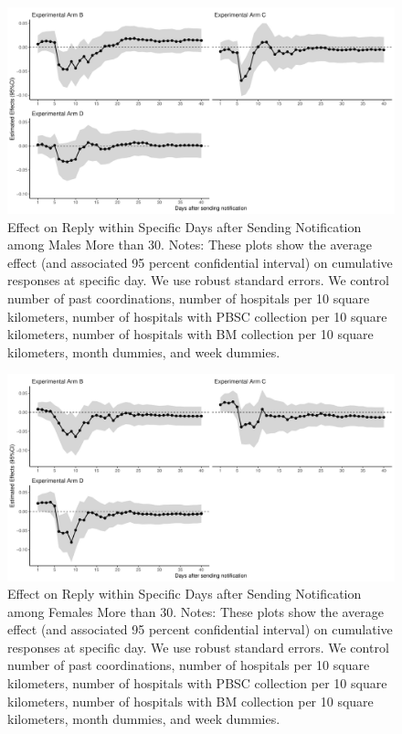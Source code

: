 \documentclass[
]{article}
\begin{document}
\begin{figure}[t]
\includegraphics{body_files/figure-latex/old-male-flow-1} \caption{Effect on Reply within Specific Days after Sending Notification among Males More than 30. Notes: These plots show the average effect (and associated 95 percent confidential interval) on cumulative responses at specific day. We use robust standard errors. We control number of past coordinations, number of hospitals per 10 square kilometers, number of hospitals with PBSC collection per 10 square kilometers, number of hospitals with BM collection per 10 square kilometers, month dummies, and week dummies.}\label{fig:old-male-flow}
\end{figure}

\begin{figure}[t]
\includegraphics{body_files/figure-latex/old-female-flow-1} \caption{Effect on Reply within Specific Days after Sending Notification among Females More than 30. Notes: These plots show the average effect (and associated 95 percent confidential interval) on cumulative responses at specific day. We use robust standard errors. We control number of past coordinations, number of hospitals per 10 square kilometers, number of hospitals with PBSC collection per 10 square kilometers, number of hospitals with BM collection per 10 square kilometers, month dummies, and week dummies.}\label{fig:old-female-flow}
\end{figure}
\end{document}
